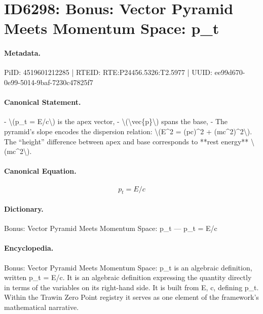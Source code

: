 \section*{ID6298: Bonus: Vector Pyramid Meets Momentum Space: p\_t}
\paragraph{Metadata.}
PiID: 4519601212285 | RTEID: RTE:P24456.5326:T2.5977 | UUID: ee99d670-0e99-5014-9baf-7230c47825f7

\paragraph{Canonical Statement.}
- \textbackslash{}(p\_t = E/c\textbackslash{}) is the apex vector, - \textbackslash{}(\textbackslash{}vec\{p\}\textbackslash{}) spans the base, - The pyramid’s slope encodes the dispersion relation: \textbackslash{}(E\textasciicircum{}2 = (pc)\textasciicircum{}2 + (mc\textasciicircum{}2)\textasciicircum{}2\textbackslash{}). The “height” difference between apex and base corresponds to **rest energy** \textbackslash{}(mc\textasciicircum{}2\textbackslash{}).

\paragraph{Canonical Equation.}
\[
p_t = E/c
\]

\paragraph{Dictionary.}
Bonus: Vector Pyramid Meets Momentum Space: p\_t — p\_t = E/c

\paragraph{Encyclopedia.}
Bonus: Vector Pyramid Meets Momentum Space: p\_t is an algebraic definition, written p\_t = E/c. It is an algebraic definition expressing the quantity directly in terms of the variables on its right-hand side. It is built from E, c, defining p\_t. Within the Trawin Zero Point registry it serves as one element of the framework's mathematical narrative.
